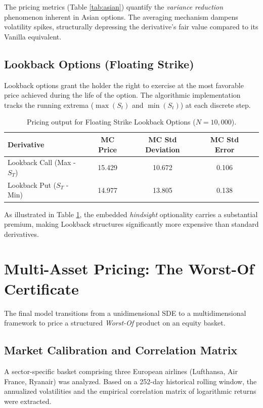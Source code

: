 \documentclass{report}
\begin{document}
The pricing metrics (Table \ref{tab:asian}) quantify the \textit{variance reduction} phenomenon inherent in Asian options. The averaging mechanism dampens volatility spikes, structurally depressing the derivative's fair value compared to its Vanilla equivalent.

\subsection{Lookback Options (Floating Strike)}
Lookback options grant the holder the right to exercise at the most favorable price achieved during the life of the option. The algorithmic implementation tracks the running extrema ($\max(S_t)$ and $\min(S_t)$) at each discrete step.

\begin{table}[htbp]
    \centering
    \begin{tabular}{lcccc}
        \toprule
        \textbf{Derivative} & \textbf{MC Price} & \textbf{MC Std Deviation} & \textbf{MC Std Error} \\
        \midrule
        Lookback Call (Max - $S_T$) & 15.429 & 10.672 & 0.106 \\
        Lookback Put ($S_T$ - Min) & 14.977 & 13.805 & 0.138 \\
        \bottomrule
    \end{tabular}
    \caption{Pricing output for Floating Strike Lookback Options ($N=10{,}000$).}
    \label{tab:lookback}
\end{table}

As illustrated in Table \ref{tab:lookback}, the embedded \textit{hindsight} optionality carries a substantial premium, making Lookback structures significantly more expensive than standard derivatives.

\section{Multi-Asset Pricing: The Worst-Of Certificate}
The final model transitions from a unidimensional SDE to a multidimensional framework to price a structured \textit{Worst-Of} product on an equity basket.

\subsection{Market Calibration and Correlation Matrix}
A sector-specific basket comprising three European airlines (Lufthansa, Air France, Ryanair) was analyzed. Based on a 252-day historical rolling window, the annualized volatilities and the empirical correlation matrix of logarithmic returns were extracted.
\end{document}
